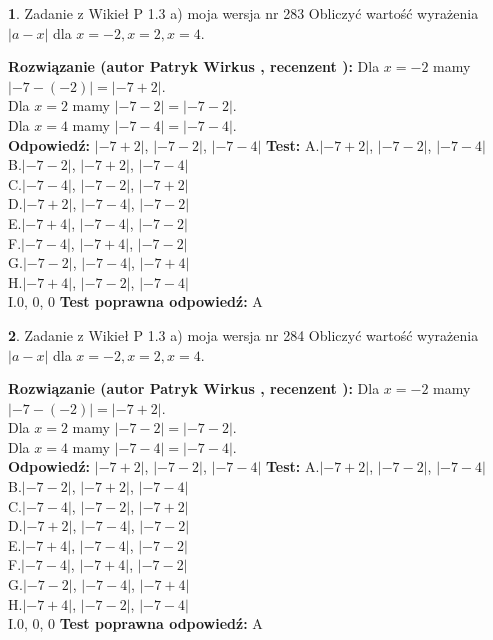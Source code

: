 \documentclass[12pt, a4paper]{article}
\theoremstyle{definition} %
\newtheorem{zad}{}
\newcommand{\zadStart}[1]{\begin{zad}#1\newline}
\newcommand{\zadStop}{\end{zad}}
\newcommand{\rozwStart}[2]{\noindent \textbf{Rozwiązanie (autor #1 , recenzent #2): }\newline}
\newcommand{\rozwStop}{\newline}
\newcommand{\odpStart}{\noindent \textbf{Odpowiedź:}\newline}
\newcommand{\odpStop}{\newline}
\newcommand{\testStart}{\noindent \textbf{Test:}\newline}
\newcommand{\testStop}{\newline}
\newcommand{\kluczStart}{\noindent \textbf{Test poprawna odpowiedź:}\newline}
\newcommand{\kluczStop}{\newline}
\begin{document}
\zadStart{Zadanie z Wikieł P 1.3 a) moja wersja nr 283}
Obliczyć wartość wyrażenia $|a - x|$ dla $x=-2,x=2,x=4$.
\zadStop
\rozwStart{Patryk Wirkus}{}
Dla $x = -2$ mamy $|-7 - (-2)| = |-7 + 2|$.\\
Dla $x = 2$ mamy $|-7 - 2| = |-7 - 2|$.\\
Dla $x = 4$ mamy $|-7 - 4| = |-7 - 4|$.\\
\rozwStop
\odpStart
$|-7 + 2|$, $|-7 - 2|$, $|-7 - 4|$
\odpStop
\testStart
A.$|-7 + 2|$, $|-7 - 2|$, $|-7 - 4|$\\
B.$|-7 - 2|$, $|-7 + 2|$, $|-7 - 4|$\\
C.$|-7 - 4|$, $|-7 - 2|$, $|-7 + 2|$\\
D.$|-7 + 2|$, $|-7 - 4|$, $|-7 - 2|$\\
E.$|-7 + 4|$, $|-7 - 4|$, $|-7 - 2|$\\
F.$|-7 - 4|$, $|-7 + 4|$, $|-7 - 2|$\\
G.$|-7 - 2|$, $|-7 - 4|$, $|-7 + 4|$\\
H.$|-7 + 4|$, $|-7 - 2|$, $|-7 - 4|$\\
I.$0$, $0$, $0$
\testStop
\kluczStart
A
\kluczStop



\zadStart{Zadanie z Wikieł P 1.3 a) moja wersja nr 284}
Obliczyć wartość wyrażenia $|a - x|$ dla $x=-2,x=2,x=4$.
\zadStop
\rozwStart{Patryk Wirkus}{}
Dla $x = -2$ mamy $|-7 - (-2)| = |-7 + 2|$.\\
Dla $x = 2$ mamy $|-7 - 2| = |-7 - 2|$.\\
Dla $x = 4$ mamy $|-7 - 4| = |-7 - 4|$.\\
\rozwStop
\odpStart
$|-7 + 2|$, $|-7 - 2|$, $|-7 - 4|$
\odpStop
\testStart
A.$|-7 + 2|$, $|-7 - 2|$, $|-7 - 4|$\\
B.$|-7 - 2|$, $|-7 + 2|$, $|-7 - 4|$\\
C.$|-7 - 4|$, $|-7 - 2|$, $|-7 + 2|$\\
D.$|-7 + 2|$, $|-7 - 4|$, $|-7 - 2|$\\
E.$|-7 + 4|$, $|-7 - 4|$, $|-7 - 2|$\\
F.$|-7 - 4|$, $|-7 + 4|$, $|-7 - 2|$\\
G.$|-7 - 2|$, $|-7 - 4|$, $|-7 + 4|$\\
H.$|-7 + 4|$, $|-7 - 2|$, $|-7 - 4|$\\
I.$0$, $0$, $0$
\testStop
\kluczStart
A
\kluczStop
\end{document}

